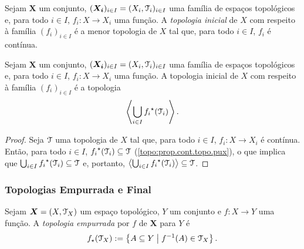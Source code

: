 \begin{defi}
Sejam $\bm X$ um conjunto, $(\bm{X_i})_{i \in I} = (X_i,\mathcal{T}_i)_{i \in I}$ uma família de espaços topológicos e, para todo $i \in I$, $f_i: X \to X_i$ uma função. A \emph{topologia inicial} de $X$ com respeito à família $(f_i)_{i \in I}$ é a menor topologia de $X$ tal que, para todo $i \in I$, $f_i$ é contínua.
\end{defi}

\begin{prop}
Sejam $\bm X$ um conjunto, $(\bm{X_i})_{i \in I} = (X_i,\mathcal{T}_i)_{i \in I}$ uma família de espaços topológicos e, para todo $i \in I$, $f_i: X \to X_i$ uma função. A topologia inicial de $X$ com respeito à família $(f_i)_{i \in I}$ é a topologia
	\begin{equation*}
	\left\langle \bigcup_{i \in I} {f_i}^\star(\mathcal{T}_i) \right\rangle.
	\end{equation*}
\end{prop}
\begin{proof}
Seja $\mathcal{T}$ uma topologia de $X$ tal que, para todo $i \in I$, $f_i: X \to X_i$ é contínua. Então, para todo $i \in I$, ${f_i}^\star(\mathcal{T}_i) \subseteq \mathcal{T}$ (\ref{topo:prop.cont.topo.pux}), o que implica que $\bigcup_{i \in I} {f_i}^\star(\mathcal{T}_i) \subseteq \mathcal{T}$ e, portanto, $\left\langle \bigcup_{i \in I} {f_i}^\star(\mathcal{T}_i) \right\rangle \subseteq \mathcal{T}$.
\end{proof}

\subsubsection{Topologias Empurrada e Final}

\begin{defi}
Sejam $\bm X = (X,\mathcal{T}_X)$ um espaço topológico, $Y$ um conjunto e $f: X \to Y$ uma função. A \emph{topologia empurrada} por $f$ de $\bm X$ para $Y$ é
	\begin{equation*}
	f_\star(\mathcal{T}_X) := \left\{A \subseteq Y \;\middle\vert\; f^{-1}(A) \in \mathcal{T}_X \right\}.
	\end{equation*}
\end{defi}

